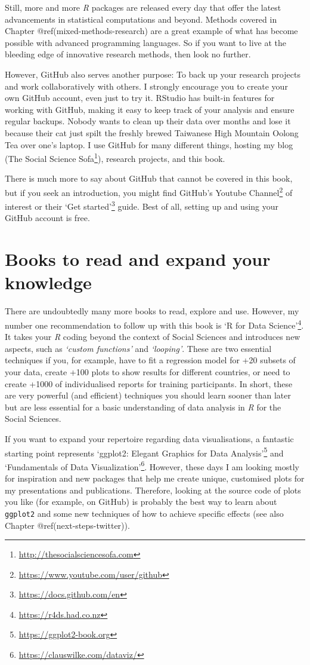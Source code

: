 \documentclass[
  letterpaper,
]{krantz}
\renewcommand{\href}[2]{#2\footnote{\url{#1}}}
\begin{document}
Still, more and more \emph{R} packages are released every day that offer
the latest advancements in statistical computations and beyond. Methods
covered in Chapter @ref(mixed-methods-research) are a great example of
what has become possible with advanced programming languages. So if you
want to live at the bleeding edge of innovative research methods, then
look no further.

However, GitHub also serves another purpose: To back up your research
projects and work collaboratively with others. I strongly encourage you
to create your own GitHub account, even just to try it. RStudio has
built-in features for working with GitHub, making it easy to keep track
of your analysis and ensure regular backups. Nobody wants to clean up
their data over months and lose it because their cat just spilt the
freshly brewed Taiwanese High Mountain Oolong Tea over one's laptop. I
use GitHub for many different things, hosting my blog
(\href{http://thesocialsciencesofa.com}{The Social Science Sofa}),
research projects, and this book.

There is much more to say about GitHub that cannot be covered in this
book, but if you seek an introduction, you might find
\href{https://www.youtube.com/user/github}{GitHub's Youtube Channel} of
interest or their \href{https://docs.github.com/en}{`Get started'}
guide. Best of all, setting up and using your GitHub account is free.

\section{Books to read and expand your
knowledge}\label{sec-next-steps-books}

There are undoubtedly many more books to read, explore and use. However,
my number one recommendation to follow up with this book is
\href{https://r4ds.had.co.nz}{`R for Data Science'}. It takes your
\emph{R} coding beyond the context of Social Sciences and introduces new
aspects, such as \emph{`custom functions'} and \emph{`looping'}. These
are two essential techniques if you, for example, have to fit a
regression model for +20 subsets of your data, create +100 plots to show
results for different countries, or need to create +1000 of
individualised reports for training participants. In short, these are
very powerful (and efficient) techniques you should learn sooner than
later but are less essential for a basic understanding of data analysis
in \emph{R} for the Social Sciences.

If you want to expand your repertoire regarding data visualisations, a
fantastic starting point represents
\href{https://ggplot2-book.org}{`ggplot2: Elegant Graphics for Data
Analysis'} and \href{https://clauswilke.com/dataviz/}{`Fundamentals of
Data Visualization'}. However, these days I am looking mostly for
inspiration and new packages that help me create unique, customised
plots for my presentations and publications. Therefore, looking at the
source code of plots you like (for example, on GitHub) is probably the
best way to learn about \texttt{ggplot2} and some new techniques of how
to achieve specific effects (see also Chapter @ref(next-steps-twitter)).
\end{document}

